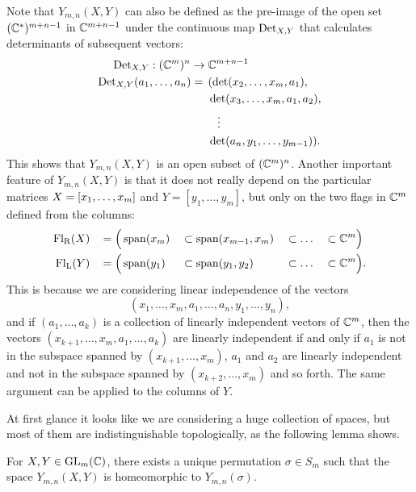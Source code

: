 Note that $Y_{m,n}(X,Y)$ can also be defined as the
pre-image of the open set $(\mathbb{C}^*)^{m+n-1}$ in $\mathbb{C}^{m+n-1}$ under the
continuous map $\operatorname{Det}_{X,Y}$ that calculates determinants of subsequent
vectors:
\begin{align*}
  \operatorname{Det}_{X,Y} : (\mathbb{C}^m)^n \to &\;\mathbb{C}^{m+n-1} \\
  \operatorname{Det}_{X,Y}(a_1,\dots,a_n) = \,&\; (\det(x_2,\dots,x_m,a_1),\\
  &\; \det(x_3,\dots,x_m,a_1,a_2), \\
  &\;\;\;\; \vdots\\
  &\; \det(a_n,y_1,\dots,y_{m-1})).
\end{align*}
This shows that $Y_{m,n}(X,Y)$ is an open subset of
$(\mathbb{C}^m)^n$. Another important
feature of $Y_{m,n}(X,Y)$ is that it does not really depend on the
particular matrices
$X =\nobreak [x_1,\dots,x_m]$ and $Y = [y_1,\dots,y_m]$,
but only on the two flags in $\mathbb{C}^{m}$ defined from the columns:
\begin{alignat*}{5}
  \mathrm{Fl_R}(X)\, &&= \Big(&\operatorname{span}(x_m) &&\subset \operatorname{span}(x_{m-1},x_m)
  &&\subset \dots &&\subset \mathbb{C}^m\Big) \\
  \mathrm{Fl_L}(Y)\, &&= \Big(&\operatorname{span}(y_1) &&\subset \operatorname{span}(y_1,y_2) &&\subset
  \dots &&\subset \mathbb{C}^m\Big).
\end{alignat*}
This is because we are considering linear independence of the vectors
\[ (x_1,\dots,x_m,a_1,\dots,a_n,y_1,\dots,y_n), \]
and if $(a_1,\dots,a_{k})$ is a collection of linearly independent
vectors of $\mathbb{C}^m$, then the vectors
$(x_{k+1},\dots,x_m,a_1,\dots,a_{k})$ are
linearly independent if and only if $a_1$ is not in the subspace
spanned by $(x_{k+1},\dots,x_m)$, $a_1$ and $a_2$ are linearly
independent and not in the
subspace spanned by $(x_{k+2},\dots,x_m)$ and so forth. The same
argument can be applied to the columns of $Y$.

At first glance it looks like we are considering a huge collection of
spaces, but most of them are indistinguishable topologically, as the
following lemma shows.

\begin{lemma} \label{lem:rum-perm}
  For $X,Y\in \operatorname{GL}_m(\mathbb{C})$, there exists a unique permutation $\sigma
  \in S_m$ such that the space
  $Y_{m,n}(X,Y)$ is homeomorphic to $Y_{m,n}(\sigma)$.
\end{lemma}

